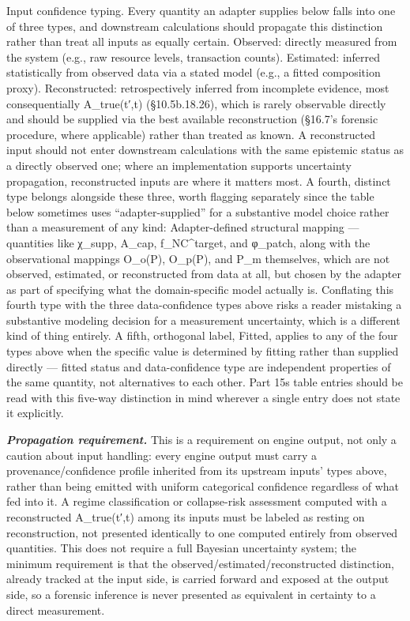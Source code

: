 \documentclass[
]{article}
\begin{document}
Input confidence typing. Every quantity an adapter supplies below falls
into one of three types, and downstream calculations should propagate
this distinction rather than treat all inputs as equally certain.
Observed: directly measured from the system (e.g., raw resource levels,
transaction counts). Estimated: inferred statistically from observed
data via a stated model (e.g., a fitted composition proxy).
Reconstructed: retrospectively inferred from incomplete evidence, most
consequentially A\_true(t′,t) (§10.5b.18.26), which is rarely observable
directly and should be supplied via the best available reconstruction
(§16.7's forensic procedure, where applicable) rather than treated as
known. A reconstructed input should not enter downstream calculations
with the same epistemic status as a directly observed one; where an
implementation supports uncertainty propagation, reconstructed inputs
are where it matters most. A fourth, distinct type belongs alongside
these three, worth flagging separately since the table below sometimes
uses ``adapter-supplied'' for a substantive model choice rather than a
measurement of any kind: Adapter-defined structural mapping ---
quantities like χ\_supp, A\_cap, f\_NC\^{}target, and φ\_patch, along
with the observational mappings O\_o(P), O\_p(P), and P\_m themselves,
which are not observed, estimated, or reconstructed from data at all,
but chosen by the adapter as part of specifying what the domain-specific
model actually is. Conflating this fourth type with the three
data-confidence types above risks a reader mistaking a substantive
modeling decision for a measurement uncertainty, which is a different
kind of thing entirely. A fifth, orthogonal label, Fitted, applies to
any of the four types above when the specific value is determined by
fitting rather than supplied directly --- fitted status and
data-confidence type are independent properties of the same quantity,
not alternatives to each other. Part 15s table entries should be read
with this five-way distinction in mind wherever a single entry does not
state it explicitly.

\emph{\textbf{Propagation requirement.}} This is a requirement on engine
output, not only a caution about input handling: every engine output
must carry a provenance/confidence profile inherited from its upstream
inputs' types above, rather than being emitted with uniform categorical
confidence regardless of what fed into it. A regime classification or
collapse-risk assessment computed with a reconstructed A\_true(t′,t)
among its inputs must be labeled as resting on reconstruction, not
presented identically to one computed entirely from observed quantities.
This does not require a full Bayesian uncertainty system; the minimum
requirement is that the observed/estimated/reconstructed distinction,
already tracked at the input side, is carried forward and exposed at the
output side, so a forensic inference is never presented as equivalent in
certainty to a direct measurement.
\end{document}
